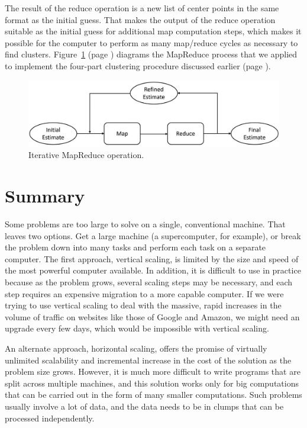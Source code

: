 The result of the reduce operation is a new list of center points
in the same format as the initial guess.
That makes the output of the
reduce operation suitable as
the initial guess for additional map computation steps,
which makes it possible for the computer to perform as many
map/reduce cycles as necessary to find clusters.
Figure~\ref{iterative-map-reduce} (page \pageref{iterative-map-reduce})
diagrams the MapReduce
process that we applied to implement the four-part clustering procedure
discussed earlier (page \pageref{cluster-process}).

\begin{figure}
    \begin{center}
        \includegraphics[scale=1]{images-cmyk/iterative-map-reduce-rev}
    \end{center}
    \caption{Iterative MapReduce operation.}
    \label{iterative-map-reduce}
\end{figure}

\section{Summary}

Some problems are too large to solve on a single, conventional machine.
That leaves two options.
Get a large machine (a supercomputer, for example),
or break the problem down into many tasks and
perform each task on a separate computer.
The first approach,
vertical scaling,
is limited by the size and speed of the most powerful computer available.
In addition, it is difficult to use in practice because as the problem grows,
several scaling steps may be necessary,
and each step requires an expensive migration to a more capable computer.
If we were trying to use vertical scaling to deal with the massive,
rapid increases in the volume of traffic on websites
like those of Google and Amazon,
we might need an upgrade every few days,
which would be impossible with vertical scaling.

An alternate approach,
horizontal scaling,
offers the promise of virtually unlimited
scalability and incremental increase
in the cost of the solution as the problem size grows.
However, it is much more difficult
to write programs that are split across multiple machines,
and this solution works only
for big computations that can be carried out
in the form of many smaller computations.
Such problems usually involve a lot of data,
and the data needs to be in clumps
that can be processed independently.

